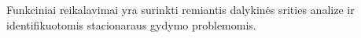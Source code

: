Funkciniai reikalavimai yra surinkti remiantis dalykinės srities analize ir identifikuotomis stacionaraus gydymo problemomis.



